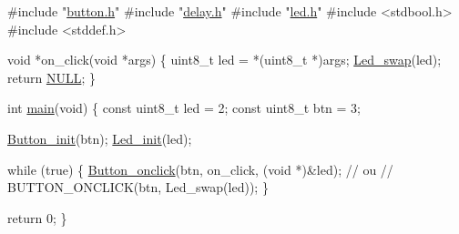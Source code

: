 \begin{DoxyCode}
\textcolor{preprocessor}{#include "\mbox{\hyperlink{button_8h}{button.h}}"}
\textcolor{preprocessor}{#include "\mbox{\hyperlink{delay_8h}{delay.h}}"}
\textcolor{preprocessor}{#include "\mbox{\hyperlink{led_8h}{led.h}}"}
\textcolor{preprocessor}{#include <stdbool.h>}
\textcolor{preprocessor}{#include <stddef.h>}

\textcolor{keywordtype}{void} *on\_click(\textcolor{keywordtype}{void} *args) \{
  uint8\_t led = *(uint8\_t *)args;
  \mbox{\hyperlink{led_8h_acd33cc1fd492aaea2d710ef97b8b6993}{Led\_swap}}(led);
  \textcolor{keywordflow}{return} \mbox{\hyperlink{analog_8c_a070d2ce7b6bb7e5c05602aa8c308d0c4}{NULL}};
\}

\textcolor{keywordtype}{int} \mbox{\hyperlink{main_8c_a840291bc02cba5474a4cb46a9b9566fe}{main}}(\textcolor{keywordtype}{void}) \{
  \textcolor{keyword}{const} uint8\_t led = 2;
  \textcolor{keyword}{const} uint8\_t btn = 3;

  \mbox{\hyperlink{button_8c_a24e8f3e30f36898b496ef95999937b28}{Button\_init}}(btn);
  \mbox{\hyperlink{led_8h_a2d207c115e6c59077fddfb3696a71686}{Led\_init}}(led);

  \textcolor{keywordflow}{while} (\textcolor{keyword}{true}) \{
    \mbox{\hyperlink{button_8c_a4d96e863c9cd2f4fb8f0b50e21ce0d91}{Button\_onclick}}(btn, on\_click, (\textcolor{keywordtype}{void} *)&led);
    \textcolor{comment}{// ou}
    \textcolor{comment}{// BUTTON\_ONCLICK(btn, Led\_swap(led));}
  \}

  \textcolor{keywordflow}{return} 0;
\}
\end{DoxyCode}
 